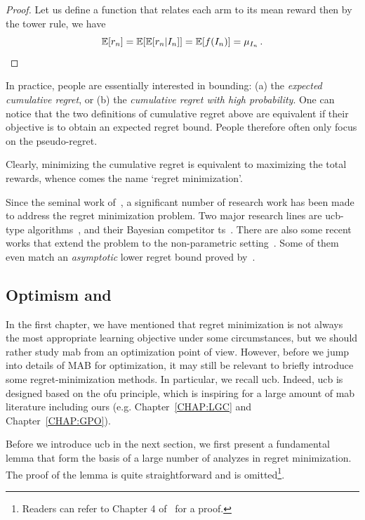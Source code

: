 \begin{proof}
	Let us define a function that relates each arm to its mean reward  then by the tower rule, we have
    \[
	    \mathbb{E}[r_n] = \mathbb{E}[\mathbb{E}[r_n|I_n]] = \mathbb{E}[f(I_n)] = \mu_{I_n}\,.
    \]
\end{proof}

In practice, people are essentially interested in bounding: (a) the \emph{expected cumulative regret}, or (b) the \emph{cumulative regret with high probability}. One can notice that the two definitions of cumulative regret above are equivalent if their objective is to obtain an expected regret bound. People therefore often only focus on the pseudo-regret.

Clearly, minimizing the cumulative regret is equivalent to maximizing the total rewards, whence comes the name `regret minimization'.

Since the seminal work of~\cite{robbins1952}, a significant number of research work has been made to address the regret minimization problem. Two major research lines are \gls{ucb}-type algorithms~\citep{auer2002ucb,cappe2013klucb,honda2015imed}, and their Bayesian competitor \gls{ts}~\citep{thompson1933,kaufmann2012thompson,agrawal2013further,korda2013thompson}. There are also some recent works that extend the problem to the non-parametric setting~\citep{baransi2014besa,chan2020ssmc,baudry2020}. Some of them even match an \emph{asymptotic} lower regret bound proved by~\citep{lai1985}. 

\subsection{Optimism and \UCB{}}\label{sec:mab.model.ucb}

In the first chapter, we have mentioned that regret minimization is not always the most appropriate learning objective under some circumstances, but we should rather study \gls{mab} from an optimization point of view. However, before we jump into details of MAB for optimization, it may still be relevant to briefly introduce some regret-minimization methods. In particular, we recall \gls{ucb}. Indeed, \gls{ucb} is designed based on the \gls{ofu} principle, which is inspiring for a large amount of \gls{mab} literature including ours (e.g. Chapter~\ref{CHAP:LGC} and Chapter~\ref{CHAP:GPO}).

Before we introduce \gls{ucb} in the next section, we first present a fundamental lemma that form the basis of a large number of analyzes in regret minimization. The proof of the lemma is quite straightforward and is omitted\footnote{Readers can refer to Chapter 4 of~\cite{lattimore2018bandits} for a proof.}.


